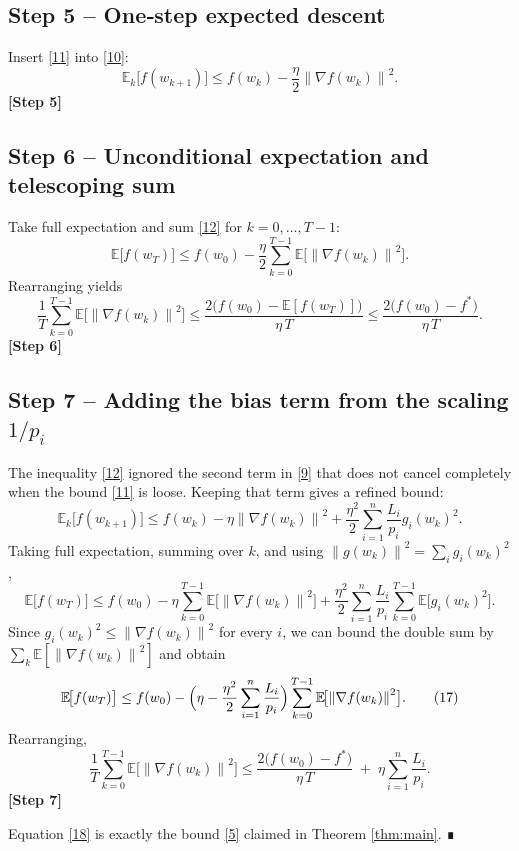 \documentclass{article}
\newcommand{\EE}{\mathbb{E}}
\newcommand{\norm}[1]{\left\lVert #1\right\rVert}
\begin{document}
\subsection*{Step 5 – One‑step expected descent}
Insert \eqref{11} into \eqref{10}:
\[
\EE_k\!\bigl[f(w_{k+1})\bigr]\le
f(w_k)-\frac{\eta}{2}\norm{\nabla f(w_k)}^{2}.
\tag{12}
\]
\textbf{[Step 5]}

\subsection*{Step 6 – Unconditional expectation and telescoping sum}
Take full expectation and sum \eqref{12} for $k=0,\dots,T-1$:
\[
\EE\!\bigl[f(w_T)\bigr]\le f(w_0)-\frac{\eta}{2}\sum_{k=0}^{T-1}\EE\!\bigl[\norm{\nabla f(w_k)}^{2}\bigr].
\tag{13}
\]
Rearranging yields
\[
\frac{1}{T}\sum_{k=0}^{T-1}\EE\!\bigl[\norm{\nabla f(w_k)}^{2}\bigr]
\le \frac{2\bigl(f(w_0)-\EE[f(w_T)]\bigr)}{\eta\,T}
\le \frac{2\bigl(f(w_0)-f^{*}\bigr)}{\eta\,T}.
\tag{14}
\]
\textbf{[Step 6]}

\subsection*{Step 7 – Adding the bias term from the scaling $1/p_i$}
The inequality \eqref{12} ignored the second term in \eqref{9} that does not cancel completely when the bound \eqref{11} is loose. Keeping that term gives a refined bound:
\[
\EE_k\!\bigl[f(w_{k+1})\bigr]\le
f(w_k)-\eta\norm{\nabla f(w_k)}^{2}
+\frac{\eta^{2}}{2}\sum_{i=1}^{n}\frac{L_i}{p_i} g_i(w_k)^{2}.
\tag{15}
\]
Taking full expectation, summing over $k$, and using $\norm{g(w_k)}^{2}=\sum_i g_i(w_k)^{2}$,
\[
\EE\!\bigl[f(w_T)\bigr]\le f(w_0)-\eta\sum_{k=0}^{T-1}\EE\!\bigl[\norm{\nabla f(w_k)}^{2}\bigr]
+\frac{\eta^{2}}{2}\sum_{i=1}^{n}\frac{L_i}{p_i}\sum_{k=0}^{T-1}\EE\!\bigl[g_i(w_k)^{2}\bigr].
\tag{16}
\]
Since $g_i(w_k)^{2}\le \norm{\nabla f(w_k)}^{2}$ for every $i$, we can bound the double sum by $\sum_{k}\EE[\norm{\nabla f(w_k)}^{2}]$ and obtain
\[
\EE\!\bigl[f(w_T)\bigr]\le f(w_0)-\Bigl(\eta-\frac{\eta^{2}}{2}\sum_{i=1}^{n}\frac{L_i}{p_i}\Bigr)
\sum_{k=0}^{T-1}\EE\!\bigl[\norm{\nabla f(w_k)}^{2}\bigr].
\tag{17}
\]
Rearranging,
\[
\frac{1}{T}\sum_{k=0}^{T-1}\EE\!\bigl[\norm{\nabla f(w_k)}^{2}\bigr]
\le
\frac{2\bigl(f(w_0)-f^{*}\bigr)}{\eta\,T}
\;+\;
\eta\sum_{i=1}^{n}\frac{L_i}{p_i}.
\tag{18}
\]
\textbf{[Step 7]}

Equation \eqref{18} is exactly the bound \eqref{5} claimed in Theorem \ref{thm:main}. ∎
\end{document}
